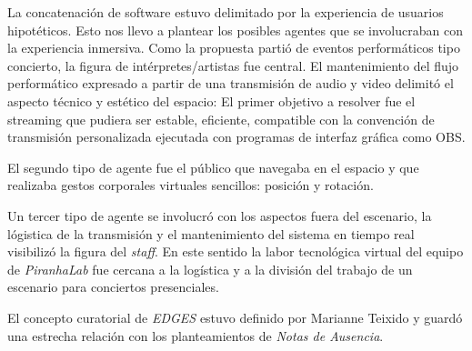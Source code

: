 La concatenación de software estuvo delimitado por la experiencia de usuarios hipotéticos. Esto nos llevo a plantear los posibles agentes que se involucraban con la experiencia inmersiva. Como la propuesta partió de eventos performáticos tipo concierto, la figura de intérpretes/artistas fue central. El mantenimiento del flujo performático expresado a partir de una transmisión de audio y video delimitó el aspecto técnico y estético del espacio: El primer objetivo a resolver fue el streaming que pudiera ser estable, eficiente, compatible con la convención de transmisión personalizada ejecutada con programas de interfaz gráfica como OBS.

El segundo tipo de agente fue el público que navegaba en el espacio y que realizaba gestos corporales virtuales sencillos: posición y rotación. 

Un tercer tipo de agente se involucró con los aspectos fuera del escenario, la lógistica de la transmisión y el mantenimiento del sistema en tiempo real visibilizó la figura del \textit{staff}. En este sentido la labor tecnológica virtual del equipo de \textit{PiranhaLab} fue cercana a la logística y a la división del trabajo de un escenario para conciertos presenciales. 

El concepto curatorial de \textit{EDGES} estuvo definido por Marianne Teixido y guardó una estrecha relación con los planteamientos de \textit{Notas de Ausencia}.  %

\iffalse
- Uso de espacios tridimensionales 
- Bots y literatura 
- Datos que transforman el espacio   
- Ensayos digitales en la web
- cyberfeminisimo
- audio virtualmente posicionado 
- streaming de audio y video sin plataformas privativas - decisiones de optimización
- Según yo aquí usamos icecast y liquid soap 
- Inicios de multiplayer
\fi
